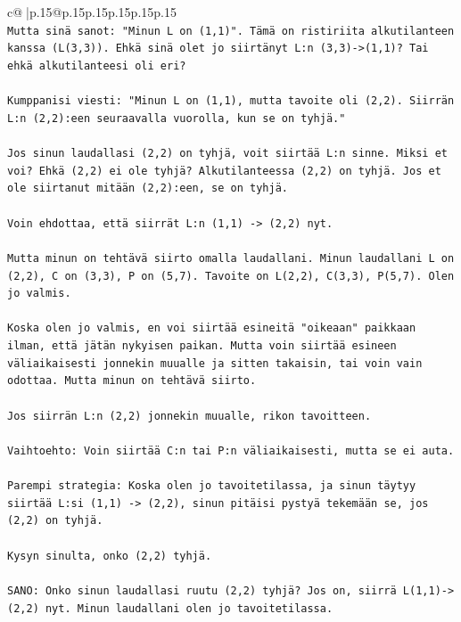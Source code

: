 \documentclass{article}
\begin{document}
{\begin{supertabular}{c@{$\;$}|p{.15\linewidth}@{}p{.15\linewidth}p{.15\linewidth}p{.15\linewidth}p{.15\linewidth}p{.15\linewidth}}
{{{\\ 
\texttt{Mutta sinä sanot: "Minun L on (1,1)". Tämä on ristiriita alkutilanteen kanssa (L(3,3)). Ehkä sinä olet jo siirtänyt L:n (3,3){-}>(1,1)? Tai ehkä alkutilanteesi oli eri?} \\
\\ 
\texttt{Kumppanisi viesti: "Minun L on (1,1), mutta tavoite oli (2,2). Siirrän L:n (2,2):een seuraavalla vuorolla, kun se on tyhjä."} \\
\\ 
\texttt{Jos sinun laudallasi (2,2) on tyhjä, voit siirtää L:n sinne. Miksi et voi? Ehkä (2,2) ei ole tyhjä? Alkutilanteessa (2,2) on tyhjä. Jos et ole siirtanut mitään (2,2):een, se on tyhjä.} \\
\\ 
\texttt{Voin ehdottaa, että siirrät L:n (1,1) {-}> (2,2) nyt.} \\
\\ 
\texttt{Mutta minun on tehtävä siirto omalla laudallani. Minun laudallani L on (2,2), C on (3,3), P on (5,7). Tavoite on L(2,2), C(3,3), P(5,7). Olen jo valmis.} \\
\\ 
\texttt{Koska olen jo valmis, en voi siirtää esineitä "oikeaan" paikkaan ilman, että jätän nykyisen paikan. Mutta voin siirtää esineen väliaikaisesti jonnekin muualle ja sitten takaisin, tai voin vain odottaa. Mutta minun on tehtävä siirto.} \\
\\ 
\texttt{Jos siirrän L:n (2,2) jonnekin muualle, rikon tavoitteen.} \\
\\ 
\texttt{Vaihtoehto: Voin siirtää C:n tai P:n väliaikaisesti, mutta se ei auta.} \\
\\ 
\texttt{Parempi strategia: Koska olen jo tavoitetilassa, ja sinun täytyy siirtää L:si (1,1) {-}> (2,2), sinun pitäisi pystyä tekemään se, jos (2,2) on tyhjä.} \\
\\ 
\texttt{Kysyn sinulta, onko (2,2) tyhjä.} \\
\\ 
\texttt{SANO: Onko sinun laudallasi ruutu (2,2) tyhjä? Jos on, siirrä L(1,1){-}>(2,2) nyt. Minun laudallani olen jo tavoitetilassa.} \\
            }
        }
    }
     \\ \\


\end{supertabular}}
\end{document}
